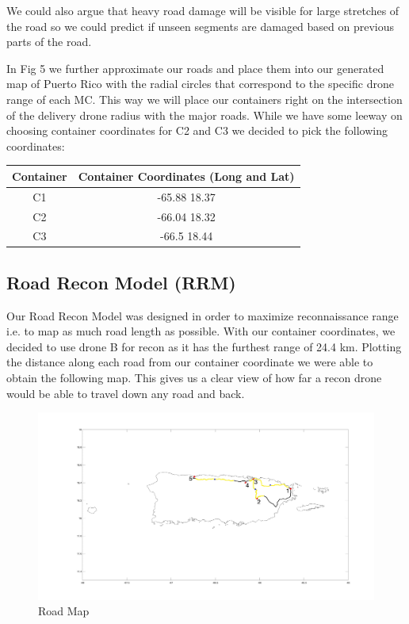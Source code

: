 \documentclass[a4paper,12pt]{article}
\begin{document}
We could also argue that heavy road damage will be visible for large stretches of the road so we could predict if unseen segments are damaged based on previous parts of the road.

\newpage

In Fig 5 we further approximate our roads and place them into our generated map of Puerto Rico with the radial circles that correspond to the specific drone range of each MC.
This way we will place our containers right on the intersection of the delivery drone radius with the major roads.  While we have some leeway on choosing container coordinates for C2 and C3 we decided to pick the following coordinates:

\begin{center}
\begin{tabular}{ |c|c| }
 \hline
 Container & Container Coordinates (Long and Lat) \\\hline
  C1 & -65.88 18.37 \\
  C2 & -66.04 18.32  \\
  C3 & -66.5 18.44  \\
 \hline
\end{tabular}
\end{center}

\newpage

\subsection{Road Recon Model (RRM)}
Our Road Recon Model was designed in order to maximize reconnaissance range i.e. to map as much road length as possible.
With our container coordinates, we decided to use drone B for recon as it has the furthest range of 24.4 km.
Plotting the distance along each road from our container coordinate we were able to obtain the following map. This gives us a clear view of how far
a recon drone would be able to travel down any road and back.

\begin{figure}[h]
\centering
\includegraphics[scale =0.18]{NewRoadNoCircles}
\caption{Road Map}
\label{road-approx}
\end{figure}
\end{document}
